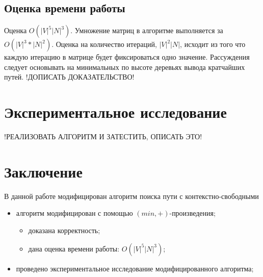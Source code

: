 \documentclass[14pt]{matmex-diploma}
\theoremstyle{definition}
\begin{document}
    \subsection{Оценка времени работы}
    Оценка $O(|V|^5|N|^3)$. Умножение матриц в алгоритме выполняется за $O(|V|^3 * |N|^2)$. Оценка на количество итераций, $|V|^2|N|$, исходит из того что каждую итерацию в матрице будет фиксироваться одно значение. Рассуждения следует основывать на минимальных по высоте деревьях вывода кратчайших путей. !ДОПИСАТЬ ДОКАЗАТЕЛЬСТВО!
    
\section{Экспериментальное исследование}
    !РЕАЛИЗОВАТЬ АЛГОРИТМ И ЗАТЕСТИТЬ, ОПИСАТЬ ЭТО! 
\section*{Заключение}
    В данной работе модифицирован алгоритм поиска пути с контекстно-свободными %
    \begin{itemize}
        \item алгоритм модифицирован с помощью $(min, +)$-произведения;
        \begin{itemize}
            \item доказана корректность;
            \item дана оценка времени работы: $O(|V|^5|N|^3)$;
        \end{itemize}
        \item проведено экспериментальное исследование модифицированного алгоритма;
    \end{itemize}
    
\setmonofont[Mapping=tex-text]{CMU Typewriter Text}


\end{document}
